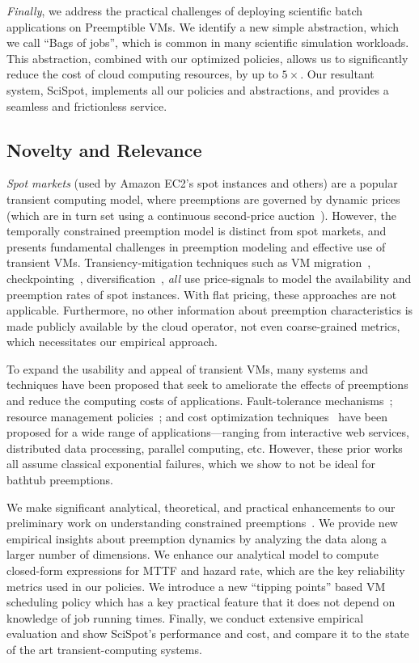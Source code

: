 \emph{Finally}, we address the practical challenges of deploying scientific batch applications on Preemptible VMs. 
We identify a new simple abstraction, which we call ``Bags of jobs'', which is common in many scientific simulation workloads.
This abstraction, combined with our optimized policies, allows us to significantly reduce the cost of cloud computing resources, by up to $5\times$.
Our resultant system, SciSpot, implements all our policies and abstractions, and provides a seamless and frictionless service.


\subsection{Novelty and Relevance}

\emph{Spot markets} (used by Amazon EC2's spot instances and others) are a popular transient computing model, where preemptions are governed by dynamic prices (which are in turn set using a continuous second-price auction~\cite{spot-pricing2}).
However, the temporally constrained preemption model is distinct from spot markets, and presents fundamental challenges in preemption modeling and effective use of transient VMs. 
Transiency-mitigation techniques such as VM migration~\cite{spotcheck}, checkpointing~\cite{flint, marathe2014exploiting}, diversification~\cite{exosphere}, \emph{all} use price-signals to model the availability and preemption rates of spot instances. 
With flat pricing, these approaches are not applicable. 
Furthermore, no other information about preemption characteristics is made publicly available by the cloud operator, not even coarse-grained metrics, which necessitates our empirical approach. 


To expand the usability and appeal of transient VMs, many systems and techniques have been proposed that seek to ameliorate the effects of preemptions and reduce the computing costs of applications. 
Fault-tolerance mechanisms~\cite{spotcheck, marathe2014exploiting}; resource management policies~\cite{exosphere, conductor}; and cost optimization techniques~\cite{dubois2016optispot, shastri2017hotspot} have been proposed for a wide range of applications---ranging from interactive web services, distributed data processing, parallel computing, etc.
However, these prior works all assume classical exponential failures, which we show to not be ideal for bathtub preemptions. 


We make significant analytical, theoretical, and practical enhancements to our preliminary work on understanding constrained preemptions~\cite{hpdc20}. 
We provide new empirical insights about preemption dynamics by analyzing the data along a larger number of dimensions.
We enhance our analytical model to compute closed-form expressions for MTTF and hazard rate, which are the key reliability metrics used in our policies. 
We introduce a new ``tipping points'' based VM scheduling policy which has a key practical feature that it does not depend on knowledge of job running times.
Finally, we conduct extensive empirical evaluation and show SciSpot's performance and cost, and compare it to the state of the art transient-computing systems. 



